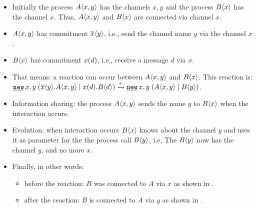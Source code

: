 \begin{itemize}
\item Initially the process $A\langle x,y\rangle$ has the channels $x,y$ and the process $B\langle x\rangle$ has the channel $x$. Thus, $A\langle x,y\rangle$ and $B\langle x\rangle$ are connected via channel $x$.
\item $A\langle x,y\rangle$ has commitment $\overline{x}\langle{y}\rangle$, i.e., send the channel name $y$ via the channel $x$.
\item $B\langle x\rangle$ has commitment $x({d})$, i.e., receive a message $d$ via $x$.
\item That means: a reaction can occur between $A\langle x,y\rangle$ and $B\langle x\rangle$. This reaction is: $\procres{x,y}{(\procpar{\out{x}{{y}}.\proccall{A}{x,y}}{\inp{x}{{d}}.\proccall{B}{d}})} \transs{\tau} \procres{x,y}{(\procpar{\proccall{A}{x,y}}{\proccall{B}{y}})}$.
\item Information sharing: the process $A\langle x,y\rangle$ sends the name $y$ to $B\langle x\rangle$ when the interaction occurs.
\item Evolution: when interaction occurs $B\langle x\rangle$ knows about the channel $y$ and uses it as parameter for the the process call $B\langle y\rangle$, i.e, The  $B\langle y\rangle$ now has the channel $y$, and no more $x$.
\item Finally, in other words: 
\begin{itemize}
\item before the reaction: $B$ was connected to $A$ via $x$ as shown in .
\item after the reaction: $B$ is connected to $A$ via $y$ as shown in .
\end{itemize}
\end{itemize}
